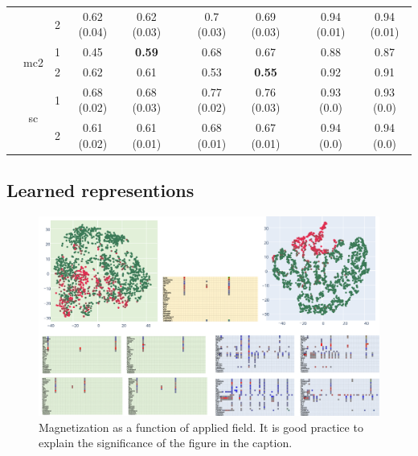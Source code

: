 \documentclass[journal,twoside,web]{ieeecolor}
\begin{document}
\begin{table}[htbp]
\begin{tabular}{ccccccccccc}
            &       & 2     & 0.62 (0.04) & 0.62 (0.03) &       & 0.7 (0.03) & 0.69 (0.03) &       & 0.94 (0.01) & 0.94 (0.01) \\
  \cmidrule{2-11}          & \multirow{2}[2]{*}{mc2} & 1     & 0.45  & \textbf{0.59} &       & 0.68  & 0.67  &       & 0.88  & 0.87 \\
            &       & 2     & 0.62  & 0.61  &       & 0.53  & \textbf{0.55} &       & 0.92  & 0.91 \\
  \cmidrule{2-11}          & \multirow{2}[2]{*}{sc} & 1     & 0.68 (0.02) & 0.68 (0.03) &       & 0.77 (0.02) & 0.76 (0.03) &       & 0.93 (0.0) & 0.93 (0.0) \\
            &       & 2     & 0.61 (0.02) & 0.61 (0.01) &       & 0.68 (0.01) & 0.67 (0.01) &       & 0.94 (0.0) & 0.94 (0.0) \\
      \bottomrule
      \bottomrule
      \end{tabular}%
    \label{tab:3}%
  \end{table}%
  
  








\subsection{Learned representions}



\begin{figure}[!t]
    \centerline{\includegraphics{images/tsne.png}}
    \caption{Magnetization as a function of applied field.
    It is good practice to explain the significance of the figure in the caption.}
    \label{fig1}
    \end{figure}
\end{document}
